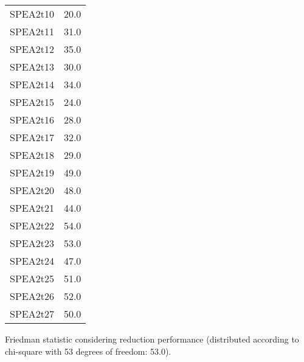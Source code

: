 \documentclass{article}
\begin{document}
\begin{table}[!htp]
\begin{tabular}{c|c}
SPEA2t10&20.0\\
SPEA2t11&31.0\\
SPEA2t12&35.0\\
SPEA2t13&30.0\\
SPEA2t14&34.0\\
SPEA2t15&24.0\\
SPEA2t16&28.0\\
SPEA2t17&32.0\\
SPEA2t18&29.0\\
SPEA2t19&49.0\\
SPEA2t20&48.0\\
SPEA2t21&44.0\\
SPEA2t22&54.0\\
SPEA2t23&53.0\\
SPEA2t24&47.0\\
SPEA2t25&51.0\\
SPEA2t26&52.0\\
SPEA2t27&50.0\\
\end{tabular}
\end{table}


Friedman statistic considering reduction performance (distributed according to chi-square with 53 degrees of freedom: 53.0).
\end{document}
